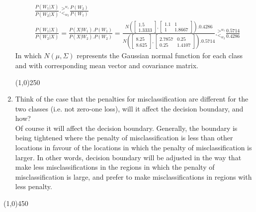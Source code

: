 \documentclass[12pt]{article}
\newcommand{\gl}{^{>^{w_1}}_{<_{w_2}}}
\newcommand{\svector}[2]{\left[ \begin{matrix} #1 \\ #2 \end{matrix}\right]}
\newcommand{\smatrix}[4]{\left[ \begin{matrix} #1 & #2 \\ #3 & #4 \end{matrix}\right]}
\begin{document}
\begin{enumerate}
\begin{align*}
&\frac{P(W_1|X)}{P(W_2|X)} .\gl \frac{P(W_2)}{P(W_1)} \\
&\frac{P(W_1|X)}{P(W_2|X)}  = \frac{P(X|W_1).P(W_1)}{P(X|W_2).P(W_2)} = \frac{N(\svector{1.5}{1.3333},\smatrix{1.1}{1}{1}{1.8667}).0.4286}{N(\svector{8.25}{8.625},\smatrix{2.7857}{0.25}{0.25}{1.4107}).0.5714} .\gl \frac{0.5714}{0.4286} 
\end{align*}
In which $N(\mu, \Sigma)$ represents the Gaussian normal function for each class and with corresponding mean vector and covariance matrix.


\begin{center}
\line(1,0){250}
\end{center}

\item Think of the case that the penalties for misclassification are different for the two classes (i.e. not zero-one loss), will it affect the decision boundary, and how? \\
Of course it will affect the decision boundary. Generally, the boundary is being tightened where the penalty of misclassification is less than other locations in favour of the locations in which the penalty of misclassification is larger. In other words, decision boundary will be adjusted in the way that make less misclassifications in the regions in which the penalty of misclassification is large, and prefer to make misclassifications in regions with less penalty.


\end{enumerate}


\begin{center}
\line(1,0){450}
\end{center}


\end{document}
